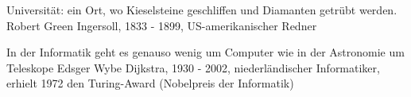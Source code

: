 {Universität: ein Ort, wo Kieselsteine geschliffen und Diamanten getrübt werden.}
{Robert Green Ingersoll, 1833 - 1899, US-amerikanischer Redner}






{In der Informatik geht es genauso wenig um Computer wie in der Astronomie um Teleskope}
{Edsger Wybe Dijkstra, 1930 - 2002, niederländischer Informatiker, erhielt 1972 den Turing-Award (Nobelpreis der Informatik)}











